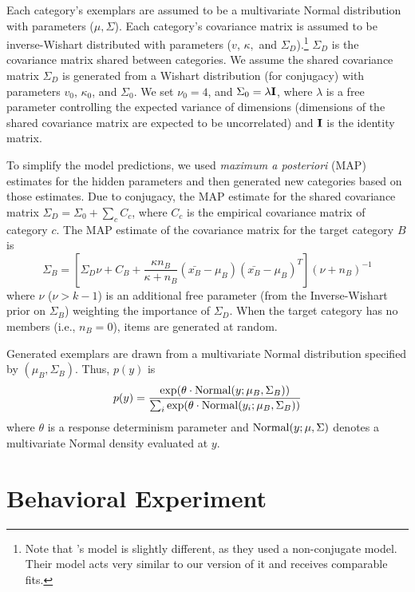 \documentclass[10pt,letterpaper]{article}
\begin{document}
Each category's exemplars are assumed to be a multivariate Normal distribution with parameters ($\mu, \Sigma$). Each category's covariance matrix is assumed to be inverse-Wishart distributed with parameters ($v$, $\kappa,$ and $\Sigma_D$).\footnote{Note that \citet{jern2013probabilistic}'s model is slightly different, as they used a non-conjugate model. Their model acts very similar to our version of it and receives comparable fits.} $\Sigma_D$ is the covariance matrix shared between categories. We assume the shared covariance matrix $\Sigma_D$ is generated from a Wishart distribution (for conjugacy) with parameters $v_0$, $\kappa_0$, and $\Sigma_0$. We set $\nu_0 = 4$, and $\Sigma_0 = \lambda {\bf I}$, where $\lambda$ is a free parameter controlling the expected variance of dimensions (dimensions of the shared covariance matrix are expected to be uncorrelated) and ${\bf I}$ is the identity matrix.

To simplify the model predictions, we used {\em maximum a posteriori} (MAP) estimates for the hidden parameters and then generated new categories based on those estimates. Due to conjugacy, the MAP estimate for the shared covariance matrix $\Sigma_D = \Sigma_0 + \sum_c{C_c}$, where $C_c$ is the empirical covariance matrix of category $c$. The MAP estimate of the covariance matrix for the target category $B$ is 
\begin{equation}
  \Sigma_B = \left[ \Sigma_D \nu + C_B +
    \dfrac
    {\kappa n_B}
    {\kappa + n_B}
    (\bar{x_B}-\mu_B)(\bar{x_B}-\mu_B)^T
  \right] (\nu + n_B)^{-1}
  \label{eq:Sigma_B}
\end{equation}
%
where $\nu$ ($\nu>k-1$) is an additional free parameter (from the Inverse-Wishart prior on $\Sigma_B$) weighting the importance of $\Sigma_{D}$. When the target category has no members (i.e., $n_B = 0$), items are generated at random.

Generated exemplars are drawn from a multivariate Normal distribution specified by $(\mu_{B}, \Sigma_{B})$. Thus, $p(y)$ is
\begin{equation}
  p(y) = \dfrac
    {\exp( \theta \cdot {\rm Normal}(y; \mu_{B}, \Sigma_{B}))}
    {\sum_i \exp( \theta \cdot {\rm Normal}(y_i; \mu_{B}, \Sigma_{B}))} 
\end{equation}
where $\theta$ is a response determinism parameter and ${\rm Normal}(y; \mu, \Sigma)$ denotes a multivariate Normal density evaluated at $y$. 

\section{Behavioral Experiment}
\end{document}

